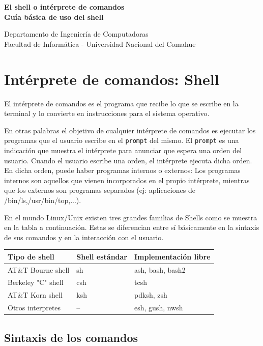 \documentclass[12pt]{article}
\def\maketitle{

 \makeatletter
 {\color{bl} \centering \huge \sc \textbf{
 El shell o intérprete de comandos \\ 
\large \vspace*{-8pt} \color{black} Guía básica de uso del shell
 \vspace*{8pt} }\par}
 \makeatother


 \makeatletter
 {\centering \small 
 	Departamento de Ingeniería de Computadoras \\
 	Facultad de Informática - Universidad Nacional del Comahue \\
 	\vspace{20pt} }
 \makeatother

}
\begin{document}
\thispagestyle{empty}
\maketitle
\setlength{\parindent}{0pt}

\section{Intérprete de comandos: Shell}

El intérprete de comandos es el programa que recibe lo que se escribe en la terminal y lo convierte en instrucciones para el sistema operativo.

En otras palabras el objetivo de cualquier intérprete de comandos es ejecutar los programas que el usuario escribe en el \texttt{prompt} del mismo. 
El \texttt{prompt} es una indicación que muestra el intérprete para anunciar que espera una orden del usuario. Cuando el usuario escribe una orden, 
el intérprete ejecuta dicha orden. En dicha orden, puede haber programas internos o externos: Los programas internos son aquellos que vienen 
incorporados en el propio intérprete, mientras que los externos son programas separados (ej: aplicaciones de /bin/ls,/usr/bin/top,...).\cite{curlin}

En el mundo Linux/Unix existen tres grandes familias de Shells como se muestra en la tabla a continuación. Estas se diferencian entre 
sí básicamente en la sintaxis de sus comandos y en la interacción con el usuario.

\begin{center}
\begin{tabular}{|l|l|l|}\hline
\rowcolor{tcA}
\textbf{Tipo de shell} & \textbf{Shell estándar} & \textbf{Implementación libre}\\\hline
AT\&T Bourne shell & sh & ash, bash, bash2\\\hline
Berkeley "C" shell & csh & tcsh\\\hline
AT\&T Korn shell & ksh & pdksh, zsh\\\hline
Otros interpretes  & -- & esh, gush, nwsh\\\hline
\end{tabular}
\end{center}

\subsection{Sintaxis de los comandos}
\end{document}
